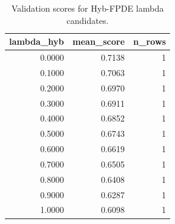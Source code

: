 \begin{table}[t]
\caption{Validation scores for Hyb-FPDE lambda candidates.}
\label{tab:lambda_distribution_computed}
\centering
\begin{tabular}{rrr}
\toprule
lambda\_hyb & mean\_score & n\_rows \\
\midrule
0.0000 & 0.7138 & 1 \\
0.1000 & 0.7063 & 1 \\
0.2000 & 0.6970 & 1 \\
0.3000 & 0.6911 & 1 \\
0.4000 & 0.6852 & 1 \\
0.5000 & 0.6743 & 1 \\
0.6000 & 0.6619 & 1 \\
0.7000 & 0.6505 & 1 \\
0.8000 & 0.6408 & 1 \\
0.9000 & 0.6287 & 1 \\
1.0000 & 0.6098 & 1 \\
\bottomrule
\end{tabular}

\end{table}
